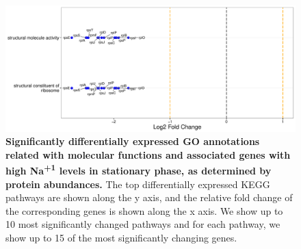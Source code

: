 \documentclass[a4paper]{article}
\begin{document}
\clearpage
\begin{figure}
	\includegraphics[width=1.0\textwidth]{../../d_figures/mf_n_05.pdf}
	\caption[Significantly altered GO annotations associated with molecular functions for protein samples in stationary phase tested for high Na\textsuperscript{+1} against base Na\textsuperscript{+1}]
	{\textbf{Significantly differentially expressed GO annotations related with molecular functions and associated genes with high Na\textsuperscript{+1} levels in stationary phase, as determined by protein abundances.} The top differentially expressed KEGG pathways are shown along the y axis, and the relative fold change of the corresponding genes is shown along the x axis. We show up to 10 most significantly changed pathways and for each pathway, we show up to 15 of the most significantly changing genes.}
\end{figure}
\end{document}
